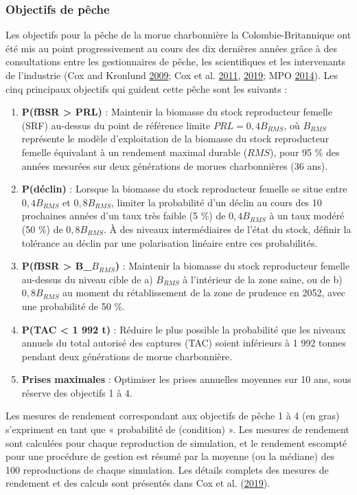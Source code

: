 \documentclass[11pt]{book}
\begin{document}
\hypertarget{objectifs-de-puxeache}{%
\subsubsection{Objectifs de pêche}\label{objectifs-de-puxeache}}

Les objectifs pour la pêche de la morue charbonnière la Colombie-Britannique ont été mis au point progressivement au cours des dix dernières années grâce à des consultations entre les gestionnaires de pêche, les scientifiques et les intervenants de l'industrie (Cox and Kronlund \protect\hyperlink{ref-cox2009evaluation}{2009}; Cox et al. \protect\hyperlink{ref-cox2011management}{2011}, \protect\hyperlink{ref-cox2019evaluating}{2019}; MPO \protect\hyperlink{ref-dfo2014performanc}{2014}). Les cinq principaux objectifs qui guident cette pêche sont les suivants :
\begin{enumerate}
\def\labelenumi{\arabic{enumi}.}

\item
  \textbf{P(fBSR \textgreater{} PRL)} : Maintenir la biomasse du stock reproducteur femelle (SRF) au-dessus du point de référence limite \(PRL = 0,4B_{RMS}\), où \(B_{RMS}\) représente le modèle d'exploitation de la biomasse du stock reproducteur femelle équivalant à un rendement maximal durable (\(RMS\)), pour 95 \% des années mesurées sur deux générations de morues charbonnières (36 ans).
\item
  \textbf{P(déclin)} : Lorsque la biomasse du stock reproducteur femelle se situe entre \(0,4B_{RMS}\) et \(0,8B_{RMS}\), limiter la probabilité d'un déclin au cours des 10 prochaines années d'un taux très faible (5 \%) de \(0,4B_{RMS}\) à un taux modéré (50 \%) de \(0,8B_{RMS}\). À des niveaux intermédiaires de l'état du stock, définir la tolérance au déclin par une polarisation linéaire entre ces probabilités.
\item
  \textbf{P(fBSR \textgreater{} B\_\(B_{RMS}\))} : Maintenir la biomasse du stock reproducteur femelle au-dessus du niveau cible de a) \(B_{RMS}\) à l'intérieur de la zone saine, ou de b) \(0,8B_{RMS}\) au moment du rétablissement de la zone de prudence en 2052, avec une probabilité de 50 \%.
\item
  \textbf{P(TAC \textless{} 1 992 t)} : Réduire le plus possible la probabilité que les niveaux annuels du total autorisé des captures (TAC) soient inférieurs à 1 992 tonnes pendant deux générations de morue charbonnière.
\item
  \textbf{Prises maximales} : Optimiser les prises annuelles moyennes sur 10 ans, sous réserve des objectifs 1 à 4.
\end{enumerate}
Les mesures de rendement correspondant aux objectifs de pêche 1 à 4 (en gras) s'expriment en tant que « probabilité de (condition) ». Les mesures de rendement sont calculées pour chaque reproduction de simulation, et le rendement escompté pour une procédure de gestion est résumé par la moyenne (ou la médiane) des 100 reproductions de chaque simulation. Les détails complets des mesures de rendement et des calculs sont présentés dans Cox et al. (\protect\hyperlink{ref-cox2019evaluating}{2019}).
\end{document}
